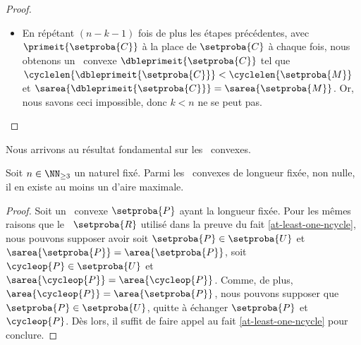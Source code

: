 \begin{proof}
\begin{itemize}
		\item En répétant $(n - k - 1)$ fois de plus les étapes précédentes, avec $\primeit{\setproba{C}}$ à la place de $\setproba{C}$ à chaque fois,
		nous obtenons un \ngone\ convexe $\dbleprimeit{\setproba{C}}$
		tel que
		$\cyclelen{\dbleprimeit{\setproba{C}}} < \cyclelen{\setproba{M}}$
		et
		$\sarea{\dbleprimeit{\setproba{C}}} = \sarea{\setproba{M}}$.
		Or, nous savons ceci impossible, donc $k < n$ ne se peut pas.
    \end{itemize}

	\null\vspace{-6ex}
\end{proof}




Nous arrivons au résultat fondamental sur les \ngones\ convexes.


\begin{fact} \label{at-least-one-ngone-convex}
    Soit $n \in \NN_{\geq3}$ un naturel fixé.
    Parmi les \ngones\ convexes de longueur fixée, non nulle, il en existe au moins un d'aire maximale.
\end{fact}


\begin{proof}
    Soit un \ngone\ convexe $\setproba{P}$ ayant la longueur fixée. 
    Pour les mêmes raisons que le \nreg\ $\setproba{R}$ utilisé dans la preuve du fait \ref{at-least-one-ncycle},
	nous pouvons supposer avoir
	soit $\setproba{P} \in \setproba{U}$ et $\sarea{\setproba{P}} = \area{\setproba{P}}$,
	soit $\cycleop{P} \in \setproba{U}$ et $\sarea{\cycleop{P}} = \area{\cycleop{P}}$.
	Comme, de plus, $\area{\cycleop{P}} = \area{\setproba{P}}$,
	nous pouvons supposer que $\setproba{P} \in \setproba{U}$,
	quitte à échanger $\setproba{P}$ et $\cycleop{P}$.
    Dès lors, il suffit de faire appel au fait \ref{at-least-one-ncycle} pour conclure.    
\end{proof}
